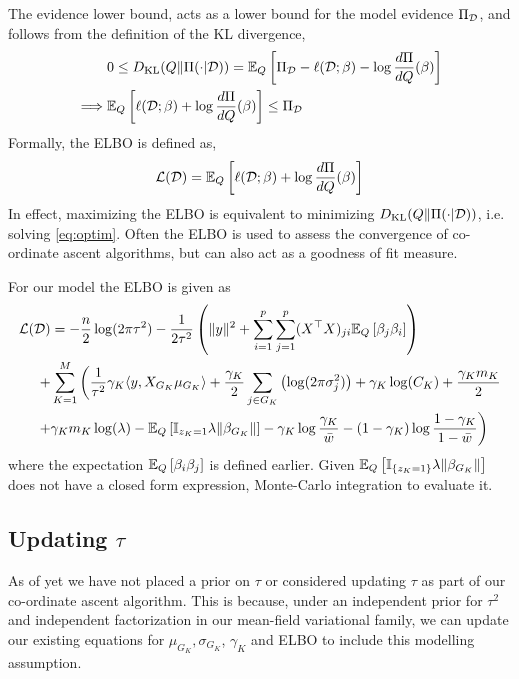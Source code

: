 \documentclass[12pt]{article}
\begin{document}
The evidence lower bound, acts as a lower bound for the model evidence $\Pi_{\mathcal{D}}$, and follows from the definition of the KL divergence,
\begin{align*}
 & 0 \leq D_\text{KL}(Q \| \Pi(\cdot | \mathcal{D})) = \mathbb{E}_Q \left[ \Pi_{\mathcal{D}} - \ell(\mathcal{D}; \beta) - \log \frac{d\Pi}{dQ} (\beta) \right] \\
    \implies & \mathbb{E}_Q \left[ \ell(\mathcal{D}; \beta) + \log \frac{d\Pi}{dQ} (\beta) \right] \leq \Pi_{\mathcal{D}}
\end{align*}
Formally, the ELBO is defined as,
\begin{equation}
   \mathcal{L}(\mathcal{D}) = \mathbb{E}_Q \left[ \ell(\mathcal{D}; \beta) + \log \frac{d\Pi}{dQ}(\beta) \right]
\end{equation}
In effect, maximizing the ELBO is equivalent to minimizing $D_\text{KL}(Q \| \Pi(\cdot | \mathcal{D})) $, i.e. solving \eqref{eq:optim}. Often the ELBO is used to assess the convergence of co-ordinate ascent algorithms, but can also act as a goodness of fit measure.

For our model the ELBO is given as
\begin{equation} \label{eq:elbo} 
\begin{aligned}
    \mathcal{L}(\mathcal{D}) &= 
- 
    \frac{n}{2} \log(2 \pi \tau^2) 
- 
    \frac{1}{2\tau^2} \left( \| y \|^2  + \sum_{i=1}^p \sum_{j=1}^p (X^\top X)_{ji} \mathbb{E}_Q \left[ \beta_j \beta_i \right] \right)\\
+& 
    \sum_{K=1}^M \bigg(  
\frac{1}{\tau^2} \gamma_K \langle y, X_{G_K} \mu_{G_K} \rangle
+
    \frac{\gamma_K}{2} \sum_{j \in G_K} \left( \log( 2 \pi \sigma_j^2) \right)
+
    \gamma_K \log(C_K)
+ 
    \frac{\gamma_K m_K}{2} \\
+ &
    \gamma_K m_K \log (\lambda)
-
    \mathbb{E}_Q \left[ \mathbb{I}_{z_K =1} \lambda \| \beta_{G_K} \| \right]
-
    \gamma_K \log \frac{\gamma_K}{\bar{w}}
-
    (1-\gamma_K) \log \frac{1 - \gamma_K}{1 - \bar{w}}
\bigg)
\end{aligned}
\end{equation}
where the expectation $\mathbb{E}_Q \left[ \beta_i \beta_j \right]$ is defined earlier. Given $\mathbb{E}_Q \left[ \mathbb{I}_{\{z_K = 1\}} \lambda \| \beta_{G_K} \| \right] $ does not have a closed form expression, Monte-Carlo integration to evaluate it.

\subsection{Updating $\tau$}

As of yet we have not placed a prior on $\tau$ or considered updating $\tau$ as part of our co-ordinate ascent algorithm. This is because, under an independent prior for $\tau^2$ and independent factorization in our mean-field variational family, we can update our existing equations for $\mu_{G_K}, \sigma_{G_K}$, $\gamma_K$ and ELBO to include this modelling assumption.
\end{document}
